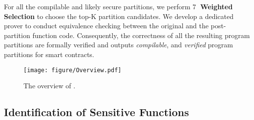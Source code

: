 For all the compilable and likely secure partitions, we perform \textcircled{7} \textbf{Weighted Selection} to choose the top-K partition candidates.
We develop a dedicated prover to conduct equivalence checking between the original and the post-partition function code.
Consequently, the correctness of all the resulting program partitions are formally verified and \tool outputs \emph{compilable}, and \emph{verified} program partitions for smart contracts.     
\begin{figure*}[h]
    \centering
    \texttt{[image: figure/Overview.pdf]}
    \caption{The overview of \tool.}
    \label{fig:overview}
\end{figure*}

\subsection{Identification of Sensitive Functions}
\label{sec:identification}

